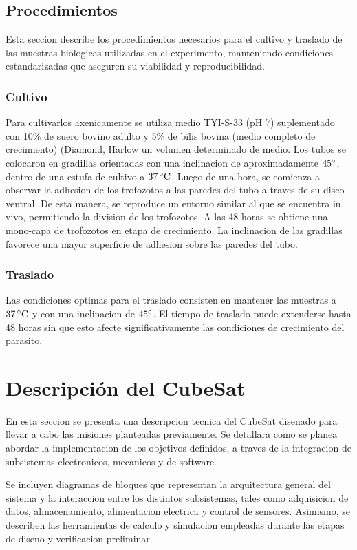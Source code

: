   \subsection{Procedimientos}
    Esta seccion describe los procedimientos necesarios para el cultivo y traslado de las muestras
    biologicas utilizadas en el experimento, manteniendo condiciones estandarizadas que
    aseguren su viabilidad y reproducibilidad.

    \subsubsection{Cultivo}
    Para cultivarlos axenicamente se utiliza medio TYI-S-33 (pH 7) suplementado con 10\% de
    suero bovino adulto y 5\% de bilis bovina (medio completo de crecimiento) (Diamond, Harlow
    un volumen determinado de medio. Los tubos se colocaron en gradillas orientadas con una
    inclinacion de aproximadamente $45^{\circ}$, dentro de una estufa de cultivo a $37 \,^\circ\mathrm{C}$.
    Luego de una hora, se comienza a observar la adhesion de los trofozotos a las paredes del
    tubo a traves de su disco ventral. De esta manera, se reproduce un entorno similar al que se
    encuentra in vivo, permitiendo la division de los trofozotos. A las 48 horas se obtiene una
    mono-capa de trofozotos en etapa de crecimiento. La inclinacion de las gradillas favorece
    una mayor superficie de adhesion sobre las paredes del tubo.

    \subsubsection{Traslado}
    Las condiciones optimas para el traslado consisten en mantener las muestras a $37\,^\circ\mathrm{C}$ y con
    una inclinacion de $45^{\circ}$. El tiempo de traslado puede extenderse hasta 48 horas sin que esto
    afecte significativamente las condiciones de crecimiento del parasito.

\section{Descripción del CubeSat}
En esta seccion se presenta una descripcion tecnica del CubeSat disenado para llevar a
cabo las misiones planteadas previamente. Se detallara como se planea abordar la implementacion de
los objetivos definidos, a traves de la integracion de subsistemas electronicos, mecanicos y de software.

Se incluyen diagramas de bloques que representan la arquitectura general del sistema y la
interaccion entre los distintos subsistemas, tales como adquisicion de datos, almacenamiento,
alimentacion electrica y control de sensores. Asimismo, se describen las herramientas de
calculo y simulacion empleadas durante las etapas de diseno y verificacion preliminar.

